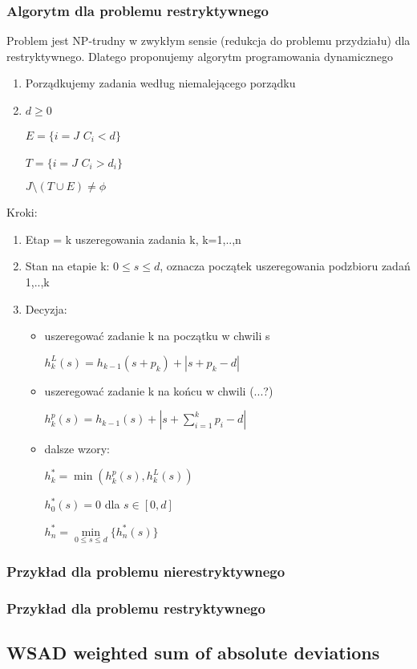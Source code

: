 \documentclass[12pt,a4paper]{article}
\begin{document}
\subsubsection{Algorytm dla problemu restryktywnego}
Problem jest NP-trudny w zwykłym sensie (redukcja do problemu przydziału) dla restryktywnego. Dlatego proponujemy algorytm programowania dynamicznego
\begin{enumerate}
\item Porządkujemy zadania według niemalejącego porządku
\item $d\geq 0$

$E=\{i=J$ $C_{i}<d\}$

$T=\{i=J$ $C_{i}>d_{i}\}$

${J\setminus(T\cup E)\neq \phi}$
\end{enumerate}
Kroki:
\begin{enumerate}
\item Etap = k uszeregowania zadania k, k=1,..,n
\item Stan na etapie k: $0\leq s \leq d$, oznacza początek uszeregowania podzbioru zadań {1,..,k}
\item Decyzja: 
\begin{itemize}
\item uszeregować zadanie k na początku w chwili s

$h_{k}^{L}(s)=h_{k-1}(s+p_{k})+ \left | s+p_{k}-d \right |$
\item uszeregować zadanie k na końcu w chwili (...?)

$h_{k}^{p}(s)=h_{k-1}(s)+\left | s+\sum\limits_{i=1}^{k}p_{i}-d \right |$
\item dalsze wzory:

$h_{k}^{*}=\min(h_{k}^{p}(s),h_{k}^{L}(s))$

$h_{0}^{*}(s)=0$ dla $s\in [0,d]$

$h_{n}^{*}=\min\limits_{0\leq s\leq d}\{h_{n}^{*}(s)\}$
\end{itemize}
\end{enumerate}

\subsubsection{Przykład dla problemu nierestryktywnego}
\subsubsection{Przykład dla problemu restryktywnego}
\subsection{WSAD weighted sum of absolute deviations}
\end{document}
